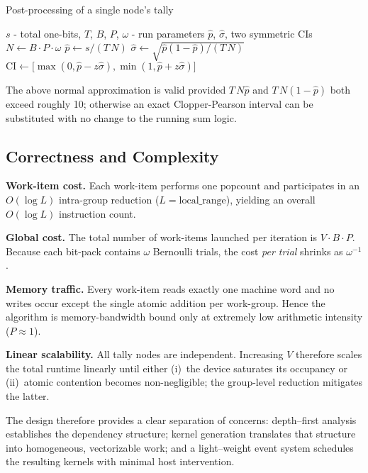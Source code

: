 \begin{algorithm}[H]
\caption{Post-processing of a single node's tally}
\label{alg:update_stats}
\begin{algorithmic}[1]
  \Require
    \(s\) - total one-bits,
    \(T\), \(B\), \(P\), \(\omega\) - run parameters
  \Ensure
    \(\widehat{p}\), \(\widehat{\sigma}\), two symmetric CIs
  \State $N\gets B\cdot P\cdot\omega$
  \State $\widehat{p}\gets s / (T\,N)$
  \State $\widehat{\sigma}\gets
          \sqrt{\widehat{p}(1-\widehat{p})/(T\,N)}$
      \State $\text{CI}\gets
        \bigl[\max(0,\widehat{p}-z\widehat{\sigma}),
              \min(1,\widehat{p}+z\widehat{\sigma})\bigr]$
  \EndFor
\end{algorithmic}
\end{algorithm}

The above normal approximation is valid provided \(T\,N\widehat{p}\)
and \(T\,N(1-\widehat{p})\) both exceed roughly 10; otherwise an exact
Clopper-Pearson interval can be substituted with no change to the running
sum logic.

\subsection{Correctness and Complexity}

\textbf{Work-item cost.}
Each work-item performs one \(\mathrm{popcount}\) and
participates in an \(O(\log L)\) intra-group reduction
(\(L\!=\!\text{local\_range}\)), yielding an overall
\(O(\log L)\) instruction count.

\textbf{Global cost.}
The total number of work-items launched per iteration is
\(V\cdot B\cdot P\).  Because each bit-pack contains \(\omega\) Bernoulli
trials, the cost \emph{per trial} shrinks as \(\omega^{-1}\).

\textbf{Memory traffic.}
Every work-item reads exactly one machine word and no writes occur except
the single atomic addition per work-group.  Hence the algorithm is
memory-bandwidth bound only at extremely low arithmetic intensity
(\(P\approx 1\)).

\textbf{Linear scalability.}
All tally nodes are independent.  Increasing \(V\) therefore scales the total
runtime linearly until either (i)~the device saturates its occupancy or
(ii)~atomic contention becomes non-negligible; the group-level reduction
mitigates the latter.

The design therefore provides a clear separation of concerns: depth--first
analysis establishes the dependency structure; kernel generation translates
that structure into homogeneous, vectorizable work; and a light--weight event
system schedules the resulting kernels with minimal host intervention.

